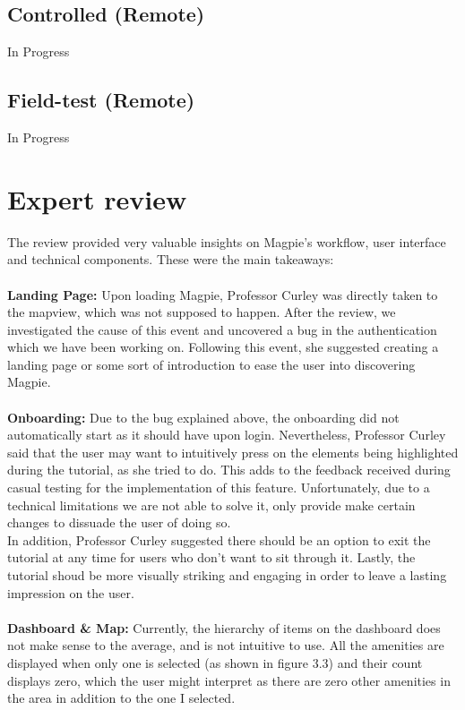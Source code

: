 \documentclass{report}
\begin{document}
\subsection{Controlled (Remote)}
In Progress
\subsection{Field-test (Remote)}
In Progress

\section{Expert review}
The review provided very valuable insights on Magpie's workflow, user interface and technical components. These were the main takeaways:\\ \\
\textbf{Landing Page: }
Upon loading Magpie, Professor Curley was directly taken to the mapview, which was not supposed to happen. After the review, we investigated the cause of this event and uncovered a bug in the authentication which we have been working on. Following this event, she suggested creating a landing page or some sort of introduction to ease the user into discovering Magpie.\\ \\
\textbf{Onboarding: }
Due to the bug explained above, the onboarding did not automatically start as it should have upon login. Nevertheless, Professor Curley said that the user may want to intuitively press on the elements being highlighted during the tutorial, as she tried to do. This adds to the feedback received during casual testing for the implementation of this feature. Unfortunately, due to a technical limitations we are not able to solve it, only provide make certain changes to dissuade the user of doing so.\\
In addition, Professor Curley suggested there should be an option to exit the tutorial at any time for users who don't want to sit through it. Lastly, the tutorial shoud be more visually striking and engaging in order to leave a lasting impression on the user.\\ \\
\textbf{Dashboard \& Map: }
Currently, the hierarchy of items on the dashboard does not make sense to the average, and is not intuitive to use. All the amenities are displayed when only one is selected (as shown in figure 3.3) and their count displays zero, which the user might interpret as there are zero other amenities in the area in addition to the one I selected.\\
\end{document}
